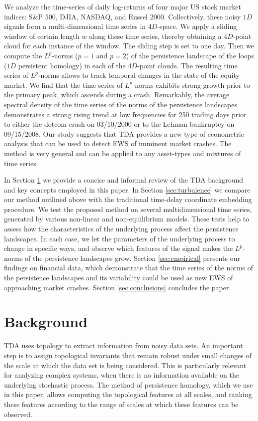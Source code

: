 \documentclass[preprint,12pt]{elsarticle}
\theoremstyle{definition}
\theoremstyle{remark}
\numberwithin{equation}{section}
\theoremstyle{definition}
\begin{document}
We analyze the time-series of daily log-returns of four major US stock market indices: S\&P 500, DJIA, NASDAQ, and Russel 2000. Collectively, these noisy $1D$ signals form a multi-dimensional time series in $4D$-space. We apply a sliding window of certain length $w$ along these time series, thereby obtaining a $4D$-point cloud for each instance of the window. The sliding step is set to one day. Then we compute the  $L^p$-norms ($p = 1$ and $p = 2$) of the persistence landscape of the loops ($1D$ persistent homology) in each of the $4D$-point clouds. The resulting time series of  $L^p$-norms allows to track temporal changes in the state of the equity market. We find that the time series of  $L^p$-norms exhibits strong growth prior to the primary peak, which ascends during a crash. Remarkably, the average spectral density of the time series of the norms of the persistence landscapes demonstrates a strong rising trend at low frequencies for 250 trading days prior to either the dotcom crash on 03/10/2000 or to the Lehman bankruptcy on 09/15/2008. Our study suggests that TDA provides a  new type of
econometric analysis that can be used to detect EWS of imminent market crashes.  The method is very general and can be applied to any asset-types and mixtures of time series.

In Section \ref{sec:background}  we provide a concise and informal review of the TDA background and key concepts employed in this paper.  In Section \ref{sec:turbulence} we compare our method outlined above with the traditional time-delay coordinate embedding procedure. We test the proposed method on several multidimensional time series, generated by various non-linear and non-equilibrium models. These tests help to assess how the characteristics of the underlying process affect the persistence landscapes.  In each case, we let the parameters of the underlying process to change  in specific ways, and observe which features of the signal makes the  $L^p$-norms of the persistence landscapes grow. Section \ref{sec:empirical} presents our findings on financial data, which demonstrate that the time series of the norms of the persistence landscapes and its variability could be used as new EWS of approaching market crashes. Section \ref{sec:conclusions} concludes the paper.




\section{Background}\label{sec:background}
TDA uses topology to extract information from noisy data sets. An important step is to assign topological invariants that remain robust under small changes of the scale at which the data set is being considered. This is particularly relevant for analyzing complex systems, when there is no information available on the underlying stochastic process. The method of persistence homology, which we use in this paper, allows computing the topological features at all scales, and ranking these features according to the range of scales at which these features can be observed.
\end{document}
